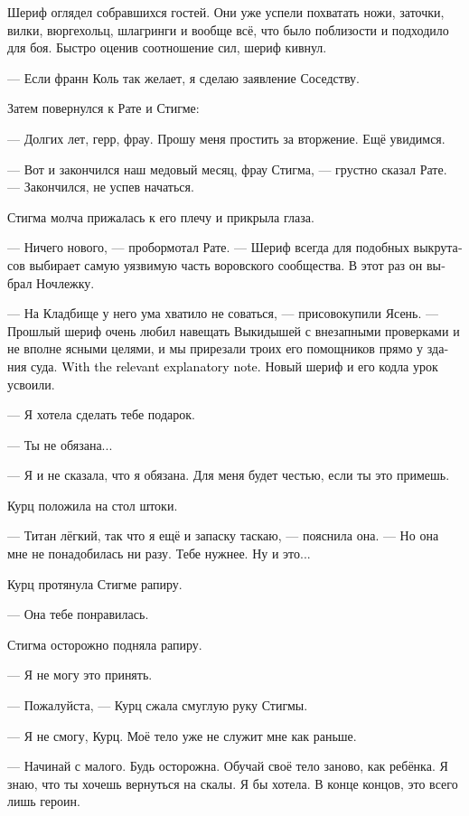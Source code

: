 \documentclass[a4paper,12pt,fleqn]{book}\usepackage{cooltooltips}\usepackage{polyglossia}\setdefaultlanguage[babelshorthands=true]{russian}\setotherlanguage{english}\defaultfontfeatures{Ligatures=TeX,Mapping=tex-text} \usepackage{xcolor}\definecolor{lightgray}{HTML}{bbbbbb}\color{lightgray}\newcommand{\ml}[3]{\textenglish{\textcolor{black}{#3}}}
\newcommand{\asterism}{\vspace{1em}{\centering\Large\bfseries$\ast~\ast~\ast$\par}\vspace{1em}}
\begin{document}
Шериф оглядел собравшихся гостей.
Они уже успели похватать ножи, заточки, вилки, вюргехольц, шлагринги и вообще всё, что было поблизости и подходило для боя.
Быстро оценив соотношение сил, шериф кивнул.

--- Если франн Коль так желает, я сделаю заявление Соседству.

Затем повернулся к Рате и Стигме:

--- Долгих лет, герр, фрау.
Прошу меня простить за вторжение.
Ещё увидимся.

--- Вот и закончился наш медовый месяц, фрау Стигма, --- грустно сказал Рате.
--- Закончился, не успев начаться.

Стигма молча прижалась к его плечу и прикрыла глаза.

\asterism

--- Ничего нового, --- пробормотал Рате.
--- Шериф всегда для подобных выкрутасов выбирает самую уязвимую часть воровского сообщества.
В этот раз он выбрал Ночлежку.

--- На Кладбище у него ума хватило не соваться, --- присовокупили Ясень.
--- Прошлый шериф очень любил навещать Выкидышей с внезапными проверками и не вполне ясными целями, и мы прирезали троих его помощников прямо у здания суда.
\ml{$0$}
{С соответствующей пояснительной запиской.}
{With the relevant explanatory note.}
Новый шериф и его кодла урок усвоили.

\asterism

--- Я хотела сделать тебе подарок.

--- Ты не обязана...

--- Я и не сказала, что я обязана.
Для меня будет честью, если ты это примешь.

Курц положила на стол штоки.

--- Титан лёгкий, так что я ещё и запаску таскаю, --- пояснила она.
--- Но она мне не понадобилась ни разу.
Тебе нужнее.
Ну и это...

Курц протянула Стигме рапиру.

--- Она тебе понравилась.

Стигма осторожно подняла рапиру.

--- Я не могу это принять.

--- Пожалуйста, --- Курц сжала смуглую руку Стигмы.

--- Я не смогу, Курц.
Моё тело уже не служит мне как раньше.

--- Начинай с малого.
Будь осторожна.
Обучай своё тело заново, как ребёнка.
Я знаю, что ты хочешь вернуться на скалы.
Я бы хотела.
В конце концов, это всего лишь героин.
\end{document}
